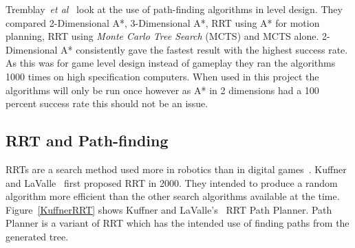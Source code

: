\documentclass[journal]{IEEEtran}
\begin{document}
Tremblay~\textit{et al}~\cite{Tremblay2014} look at the use of path-finding algorithms in level design. They compared 2-Dimensional A*, 3-Dimensional A*, RRT using A* for motion planning, RRT using \textit{Monte Carlo Tree Search} (MCTS) and MCTS alone. 2-Dimensional A* consistently gave the fastest result with the highest success rate. As this was for game level design instead of gameplay they ran the algorithms 1000 times on high specification computers. When used in this project the algorithms will only be run once however as A* in 2 dimensions had a 100 percent success rate this should not be an issue. 

\subsection{RRT and Path-finding} \label{RRTadnPathfinding}
RRTs are a search method used more in robotics than in digital games~\cite{LaValle1998, Kuffner2000}. Kuffner and LaValle~\cite{Kuffner2000} first proposed RRT in 2000. They intended to produce a random algorithm more efficient than the other search algorithms available at the time.  Figure~\ref{KuffnerRRT} shows Kuffner and LaValle's~\cite{Kuffner2000} RRT Path Planner. Path Planner is a variant of RRT which has the intended use of finding paths from the generated tree.
\end{document}
